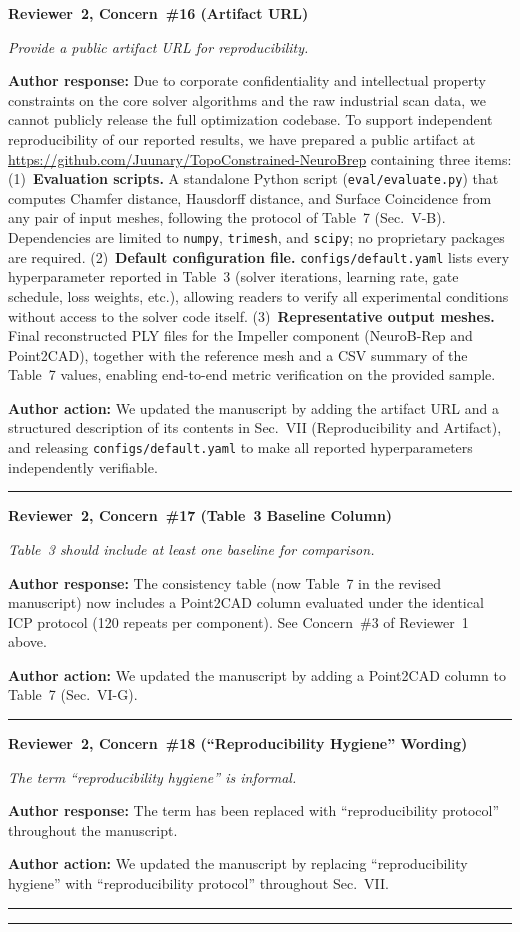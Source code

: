 \documentclass[11pt]{article}
\newcommand{\concern}[2]{\noindent\textbf{Reviewer~#1, Concern~\##2}\par}
\newcommand{\concerntext}[1]{\noindent\textit{#1}\par\medskip}
\newcommand{\authorresponse}[1]{\noindent\textbf{Author response:} #1\par\medskip}
\newcommand{\authoraction}[1]{\noindent\textbf{Author action:} We updated the manuscript by #1\par\bigskip\noindent\rule{\linewidth}{0.4pt}\par\medskip}
\begin{document}
\concern{2}{16 (Artifact URL)}
\concerntext{Provide a public artifact URL for reproducibility.}
\authorresponse{Due to corporate confidentiality and intellectual property
constraints on the core solver algorithms and the raw industrial scan data,
we cannot publicly release the full optimization codebase.
To support independent reproducibility of our reported results, we have
prepared a public artifact at
\url{https://github.com/Juunary/TopoConstrained-NeuroBrep}
containing three items:
(1)~\textbf{Evaluation scripts.}
A standalone Python script (\texttt{eval/evaluate.py}) that computes
Chamfer distance, Hausdorff distance, and Surface Coincidence from any pair
of input meshes, following the protocol of Table~7 (Sec.~V-B).
Dependencies are limited to \texttt{numpy}, \texttt{trimesh}, and
\texttt{scipy}; no proprietary packages are required.
(2)~\textbf{Default configuration file.}
\texttt{configs/default.yaml} lists every hyperparameter reported in
Table~3 (solver iterations, learning rate, gate schedule, loss weights,
etc.), allowing readers to verify all experimental conditions without
access to the solver code itself.
(3)~\textbf{Representative output meshes.}
Final reconstructed PLY files for the Impeller component (NeuroB-Rep
and Point2CAD), together with the reference mesh and a CSV summary of
the Table~7 values, enabling end-to-end metric verification on the
provided sample.}
\authoraction{adding the artifact URL and a structured description of its
contents in Sec.~VII (Reproducibility and Artifact), and releasing
\texttt{configs/default.yaml} to make all reported hyperparameters
independently verifiable.}

\concern{2}{17 (Table~3 Baseline Column)}
\concerntext{Table~3 should include at least one baseline for comparison.}
\authorresponse{The consistency table (now Table~7 in the revised manuscript)
now includes a Point2CAD column evaluated under the identical ICP
protocol (120 repeats per component). See Concern~\#3 of Reviewer~1 above.}
\authoraction{adding a Point2CAD column to Table~7 (Sec.~VI-G).}

\concern{2}{18 (``Reproducibility Hygiene'' Wording)}
\concerntext{The term ``reproducibility hygiene'' is informal.}
\authorresponse{The term has been replaced with ``reproducibility protocol''
throughout the manuscript.}
\authoraction{replacing ``reproducibility hygiene'' with ``reproducibility protocol''
throughout Sec.~VII.}

\bigskip\noindent\rule{\linewidth}{0.8pt}\bigskip
\end{document}
